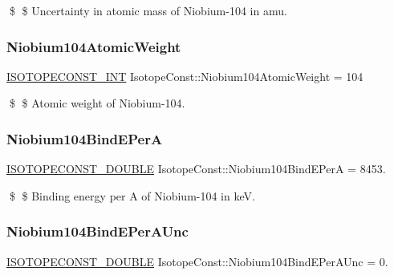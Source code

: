 \$ \$ Uncertainty in atomic mass of Niobium-\/104 in amu. \mbox{\label{group___isotope_const-_niobium-_nb104_ga5d455950222a0de61df9478f396859a6}} 
\subsubsection{\texorpdfstring{Niobium104\+Atomic\+Weight}{Niobium104AtomicWeight}}
{\footnotesize\ttfamily \mbox{\hyperlink{group___isotope_const-_macros_ga5f18360b3e99483a35c32d789e62621c}{I\+S\+O\+T\+O\+P\+E\+C\+O\+N\+S\+T\+\_\+\+I\+NT}} Isotope\+Const\+::\+Niobium104\+Atomic\+Weight = 104}

\$ \$ Atomic weight of Niobium-\/104. \mbox{\label{group___isotope_const-_niobium-_nb104_ga6ec5441b165e9317c9ae5b968e8c5767}} 
\subsubsection{\texorpdfstring{Niobium104\+Bind\+E\+PerA}{Niobium104BindEPerA}}
{\footnotesize\ttfamily \mbox{\hyperlink{group___isotope_const-_macros_ga8f45a7272ce02c0b4c65c44636ed719a}{I\+S\+O\+T\+O\+P\+E\+C\+O\+N\+S\+T\+\_\+\+D\+O\+U\+B\+LE}} Isotope\+Const\+::\+Niobium104\+Bind\+E\+PerA = 8453.}

\$ \$ Binding energy per A of Niobium-\/104 in keV. \mbox{\label{group___isotope_const-_niobium-_nb104_ga6bc52d5feb4f1b8fdf6754f0db19ff52}} 
\subsubsection{\texorpdfstring{Niobium104\+Bind\+E\+Per\+A\+Unc}{Niobium104BindEPerAUnc}}
{\footnotesize\ttfamily \mbox{\hyperlink{group___isotope_const-_macros_ga8f45a7272ce02c0b4c65c44636ed719a}{I\+S\+O\+T\+O\+P\+E\+C\+O\+N\+S\+T\+\_\+\+D\+O\+U\+B\+LE}} Isotope\+Const\+::\+Niobium104\+Bind\+E\+Per\+A\+Unc = 0.}

